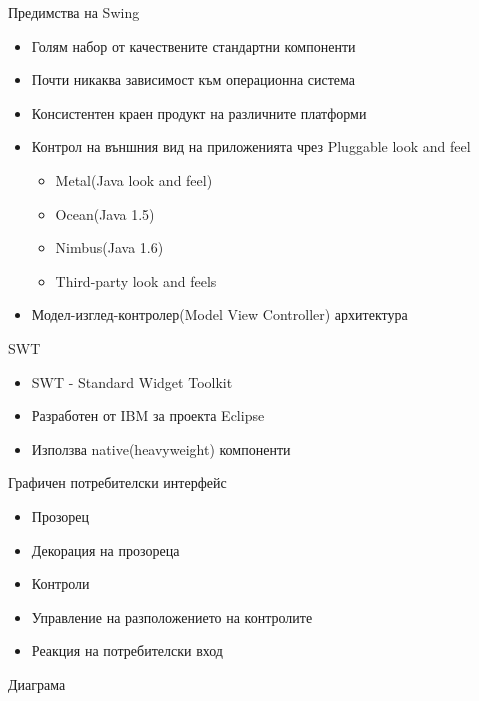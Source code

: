 \documentclass{beamer}
\begin{document}
\begin{frame}{Предимства на Swing}
  \transdissolve
  \begin{itemize}
  \item Голям набор от качествените стандартни компоненти
  \item Почти никаква зависимост към операционна система
  \item Консистентен краен продукт на различните платформи
  \item Контрол на външния вид на приложенията чрез Pluggable look and
    feel
    \begin{itemize}
      \item Metal(Java look and feel)
      \item Ocean(Java 1.5)
      \item Nimbus(Java 1.6)
      \item Third-party look and feels
    \end{itemize}
  \item Модел-изглед-контролер(Model View Controller) архитектура
  \end{itemize}
\end{frame}

\begin{frame}{SWT}
  \transdissolve
  \begin{itemize}
  \item SWT - Standard Widget Toolkit
  \item Разработен от IBM за проекта Eclipse
  \item Използва native(heavyweight) компоненти
  \end{itemize}
\end{frame}

\begin{frame}{Графичен потребителски интерфейс}
  \transdissolve
  \begin{itemize}
  \item Прозорец
  \item Декорация на прозореца
  \item Контроли
  \item Управление на разположението на контролите
  \item Реакция на потребителски вход
  \end{itemize}
\end{frame}


\begin{frame}{Диаграма}
  \transdissolve
  
\end{frame}
\end{document}
